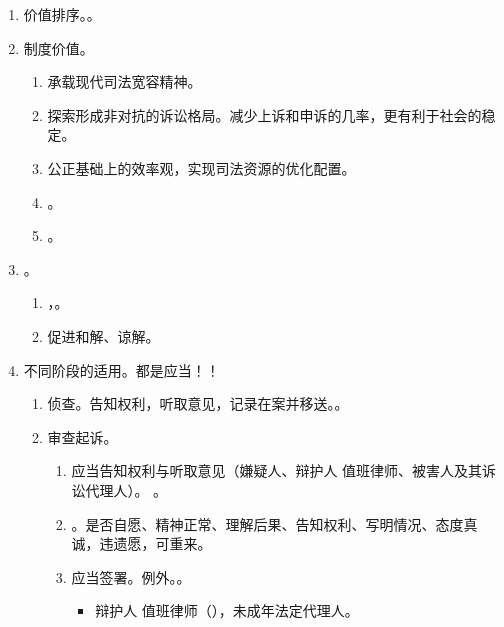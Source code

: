 \begin{enumerate}
\begin{enumerate}
          \item 价值排序。。
          \item 制度价值。
                \begin{enumerate}
                  \item 承载现代司法宽容精神。
                  \item 探索形成非对抗的诉讼格局。减少上诉和申诉的几率，更有利于社会的稳定。
                  \item 公正基础上的效率观，实现司法资源的优化配置。
                  \item {}。
                  \item {}。
                \end{enumerate}
          \item {}。
                \begin{enumerate}
                  \item {}，。
                  \item 促进和解、谅解。
                \end{enumerate}
          \item 不同阶段的适用。都是应当！！
                \begin{enumerate}
                  \item 侦查。告知权利，听取意见，记录在案并移送。。
                  \item 审查起诉。
                        \begin{enumerate}
                          \item 应当告知权利与听取意见（嫌疑人、辩护人 \hz 值班律师、被害人及其诉讼代理人）。
                                。
                          \item {}。是否自愿、精神正常、理解后果、告知权利、写明情况、态度真诚，违遗愿，可重来。
                          \item 应当签署。例外。。
                                \begin{itemize}
                                  \item 辩护人 \hz 值班律师（），未成年法定代理人。

\end{itemize}
\end{enumerate}
\end{enumerate}
\end{enumerate}
\end{enumerate}
